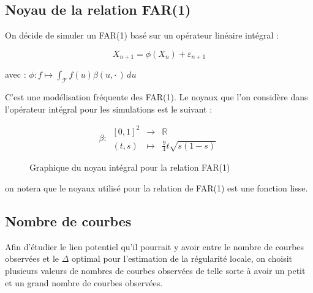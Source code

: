 \subsection{Noyau de la relation FAR(1)}
\begin{minipage}{0.48\linewidth}
	On décide de simuler un FAR(1) basé sur un opérateur linéaire intégral :

	$$
		X_{n+1} = \phi(X_n) + \varepsilon_{n+1}
	$$

	avec : $\phi : f \mapsto \displaystyle\int_{\mathcal T} f(u) \beta(u, \cdot \,) \, du$

	C'est une modélisation fréquente des FAR(1). Le noyaux que l'on considère dans l'opérateur intégral pour les simulations est le suivant :


	$$
		\beta : \, \begin{array}{ccc}
			[0,1]^2 & \longrightarrow & \mathbb R
			\\
			(t,s)   & \longmapsto     & \frac 9 4 t\sqrt{ s(1-s) }
		\end{array}
	$$

\end{minipage}
\hfill
\begin{minipage}{0.48\linewidth}
	\begin{figure}[H]
		\centering
		\caption{Graphique du noyau intégral pour la relation FAR(1)}
		\label{graph:far_kernel}
	\end{figure}
\end{minipage}

on notera que le noyaux utilisé pour la relation de FAR(1) est une fonction lisse. 

\subsection{Nombre de courbes}

Afin d'étudier le lien potentiel qu'il pourrait y avoir entre le nombre de courbes observées et le $\Delta$ optimal pour l'estimation de la régularité locale, on choisit plusieurs valeurs de nombres de courbes observées de telle sorte à avoir un \og petit \fg et un \og grand \fg nombre de courbes observées.

